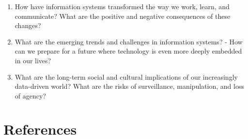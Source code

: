 \documentclass[
  letterpaper,
  DIV=11,
  numbers=noendperiod]{scrreprt}
\providecommand{\tightlist}{%
  \setlength{\itemsep}{0pt}\setlength{\parskip}{0pt}}\usepackage{longtable,booktabs,array}
\begin{document}
\begin{enumerate}
\def\labelenumi{\arabic{enumi}.}
\tightlist
\item
  How have information systems transformed the way we work, learn, and
  communicate? What are the positive and negative consequences of these
  changes?
\item
  What are the emerging trends and challenges in information systems? -
  How can we prepare for a future where technology is even more deeply
  embedded in our lives?
\item
  What are the long-term social and cultural implications of our
  increasingly data-driven world? What are the risks of surveillance,
  manipulation, and loss of agency?
\end{enumerate}

\section{References}\label{references}
\end{document}
